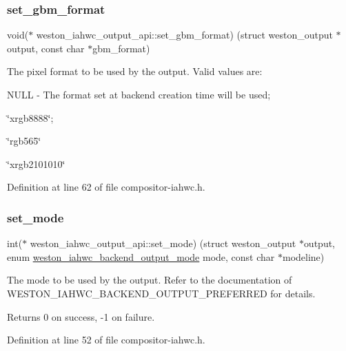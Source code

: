 \subsubsection{\texorpdfstring{set\+\_\+gbm\+\_\+format}{set\_gbm\_format}}
{\footnotesize\ttfamily void($\ast$ weston\+\_\+iahwc\+\_\+output\+\_\+api\+::set\+\_\+gbm\+\_\+format) (struct weston\+\_\+output $\ast$output, const char $\ast$gbm\+\_\+format)}

The pixel format to be used by the output. Valid values are\+:
\begin{DoxyItemize}
\item N\+U\+LL -\/ The format set at backend creation time will be used;
\item \char`\"{}xrgb8888\char`\"{};
\item \char`\"{}rgb565\char`\"{}
\item \char`\"{}xrgb2101010\char`\"{} 
\end{DoxyItemize}

Definition at line 62 of file compositor-\/iahwc.\+h.

\mbox{\label{structweston__iahwc__output__api_a1b41645a52bae88cef5a7d8706995483}} 
\subsubsection{\texorpdfstring{set\+\_\+mode}{set\_mode}}
{\footnotesize\ttfamily int($\ast$ weston\+\_\+iahwc\+\_\+output\+\_\+api\+::set\+\_\+mode) (struct weston\+\_\+output $\ast$output, enum \mbox{\hyperlink{compositor-iahwc_8h_a992bc1439aa5a0996040fdde612744e1}{weston\+\_\+iahwc\+\_\+backend\+\_\+output\+\_\+mode}} mode, const char $\ast$modeline)}

The mode to be used by the output. Refer to the documentation of W\+E\+S\+T\+O\+N\+\_\+\+I\+A\+H\+W\+C\+\_\+\+B\+A\+C\+K\+E\+N\+D\+\_\+\+O\+U\+T\+P\+U\+T\+\_\+\+P\+R\+E\+F\+E\+R\+R\+ED for details.

Returns 0 on success, -\/1 on failure. 

Definition at line 52 of file compositor-\/iahwc.\+h.

\mbox{\label{structweston__iahwc__output__api_a9338e2a3accee27c1ea4b09e5b2ce8bd}} 
